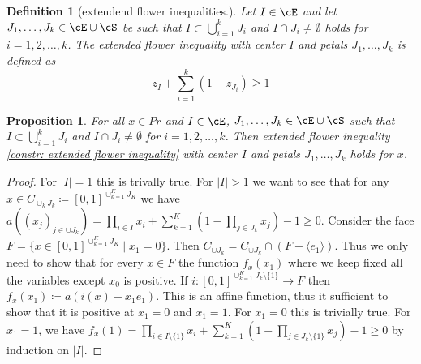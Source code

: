 \documentclass{article}
\newtheorem{definition}{Definition}
\newtheorem{proposition}[theorem]{Proposition}
\begin{document}
\begin{definition}[extendend flower inequalities.]
  Let \(I \in \cE\) and let \(J_1,\ldots,J_k \in \cE \cup \cS\) be such that \(I \subset \bigcup_{i=1}^kJ_i\) and \(I \cap J_i \neq \emptyset\) holds for \(i = 1,2,\ldots,k\). The \emph{extended flower inequality} with center \(I\) and petals \(J_1,\ldots,J_k\) is defined as
  \begin{equation}\label{constr: extended flower inequality}
    z_I + \sum_{i=1}^k(1-z_{J_i}) \geq 1
  \end{equation}
  
\end{definition}

\begin{proposition}
  For all \(x \in Pr\) and  \(I \in \cE\), \(J_1,\ldots,J_k \in \cE \cup \cS\) such that \(I \subset \bigcup_{i=1}^kJ_i\) and \(I \cap J_i \neq \emptyset\) for \(i = 1,2,\ldots,k\). Then \emph{extended flower inequality} \eqref{constr: extended flower inequality} with center \(I\) and petals \(J_1,\ldots,J_k\) holds for \(x\).
\end{proposition}
\begin{proof}
  For \(|I| = 1\) this is trivally true.
  For \(|I| > 1\) we want to see that for any \(x \in C_{\cup_kJ_k} \coloneqq [0,1]^{\cup_{k=1}^KJ_K}\) we have \(a((x_j)_{j \in \cup J_k}) = \prod_{i \in I}x_i + \sum_{k=1}^K (1-\prod_{j \in J_k}x_j) - 1 \geq 0\). Consider the face \(F = \{x \in [0,1]^{\cup_{k=1}^KJ_K} \mid x_1 = 0\}\). Then \(C_{\cup J_k} = C_{\cup J_k} \cap ( F + \langle e_1 \rangle)\).
  Thus we only need to show that for every \(x \in F\) the function \(f_x(x_1)\) where we keep fixed all the variables except \(x_0\) is positive. If \(i: [0,1]^{\cup_{k=1}^KJ_k \setminus \{1\}} \to F\) then \(f_x(x_1) \coloneqq a(i(x) + x_1e_1)\). This is an affine function, thus it sufficient to show that it is positive at \(x_1 = 0\) and \(x_1 = 1\). For \(x_1 = 0\) this is trivially true. For \(x_1 = 1\), we have \(f_x(1) = \prod_{i \in I\setminus\{1\}}x_i + \sum_{k=1}^K (1-\prod_{j \in J_k \setminus\{1\}}x_j) - 1 \geq 0\) by induction on \(|I|\).
\end{proof}
\end{document}
